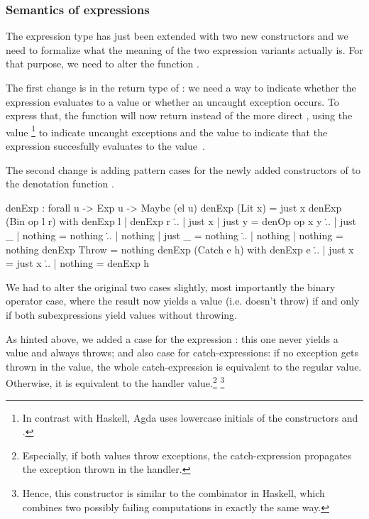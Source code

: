 \subsubsection{Semantics of expressions}

The expression type has just been extended with two new constructors and we
need to formalize what the meaning of the two expression variants actually is.
For that purpose, we need to alter the function .

The first change is in the return type of : we need a way to
indicate whether the expression evaluates to a value or whether an uncaught
exception occurs. To express that, the function  will now return
 instead of the more direct , using the value
\footnote{In contrast with Haskell, Agda uses lowercase initials
of the constructors  and .} to indicate uncaught
exceptions and the value  to indicate that the expression
succesfully evaluates to the value~.

The second change is adding pattern cases for the newly added constructors
of  to the denotation function .

\begin{code}
  denExp : forall {u} -> Exp u -> Maybe (el u)
  denExp (Lit x) = just x
  denExp (Bin op l r) with denExp l | denExp r
  \... | just x  | just y  = denOp op x y
  \... | just _  | nothing = nothing
  \... | nothing | just _  = nothing
  \... | nothing | nothing = nothing
  denExp Throw = nothing
  denExp (Catch e h) with denExp e
  \... | just x  = just x
  \... | nothing = denExp h 
\end{code}

\noindent We had to alter the original two cases slightly, most importantly the
binary operator case, where the result now yields a value (i.e.  doesn't throw)
if and only if both subexpressions yield values without throwing.

As hinted above, we added a case for the expression : this one
never yields a value and always throws; and also case for catch-expressions: if
no exception gets thrown in the value, the whole catch-expression is equivalent
to the regular value.  Otherwise, it is equivalent to the handler
value.\footnote{Especially, if both values throw exceptions, the
catch-expression propagates the exception thrown in the handler.}
\footnote{Hence, this constructor is similar to the combinator  in
Haskell, which combines two possibly failing computations in exactly the same
way.}

